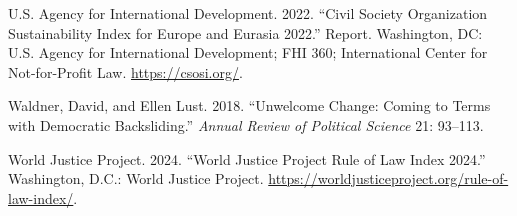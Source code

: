 \documentclass[
  letterpaper,
  DIV=11,
  numbers=noendperiod]{scrartcl}
\newlength{\cslhangindent}
\newlength{\cslentryspacingunit} %
\newenvironment{CSLReferences}[2] %
 {%
  \setlength{\parindent}{0pt}
  \ifodd #1
  \let\oldpar\par
  \def\par{\hangindent=\cslhangindent\oldpar}
  \fi
  \setlength{\parskip}{#2\cslentryspacingunit}
 }%
 {}
\begin{document}
\begin{CSLReferences}{1}{0}
\leavevmode{}%
U.S. Agency for International Development. 2022. {``Civil Society
Organization Sustainability Index for Europe and Eurasia 2022.''}
Report. Washington, DC: U.S. Agency for International Development; FHI
360; International Center for Not-for-Profit Law.
\url{https://csosi.org/}.

\leavevmode{}%
Waldner, David, and Ellen Lust. 2018. {``Unwelcome Change: Coming to
Terms with Democratic Backsliding.''} \emph{Annual Review of Political
Science} 21: 93--113.

\leavevmode{}%
World Justice Project. 2024. {``World Justice Project Rule of Law Index
2024.''} Washington, D.C.: World Justice Project.
\url{https://worldjusticeproject.org/rule-of-law-index/}.

\end{CSLReferences}
\end{document}
